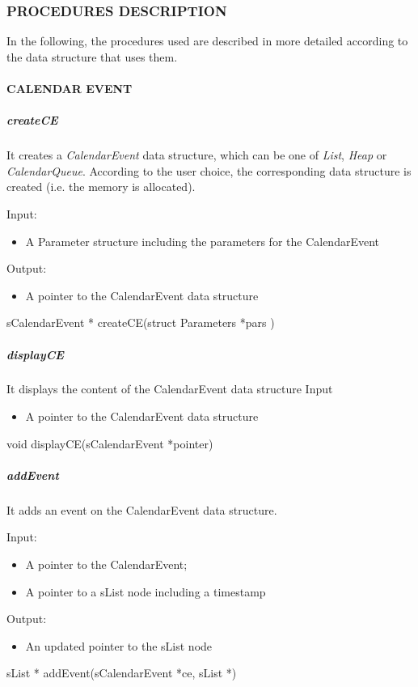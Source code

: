 \subsubsection{PROCEDURES DESCRIPTION}
In the following, the procedures used are described in more detailed according to the data structure that uses them.
	
\paragraph{CALENDAR EVENT}


\subparagraph{createCE}

It creates a \textit{CalendarEvent} data structure, which can be one of \textit{List}, \textit{Heap} or \textit{CalendarQueue}. According to the user choice, the corresponding data structure is created (i.e. the memory is allocated).

Input: 
\begin{itemize}
\item A Parameter structure including the parameters for the CalendarEvent
\end{itemize}

Output:
\begin{itemize}
\item A pointer to the CalendarEvent data structure
\end{itemize}
sCalendarEvent * createCE(struct Parameters *pars )

\subparagraph{displayCE}
	 
It displays the content of the CalendarEvent data structure
Input
\begin{itemize}
\item A pointer to the CalendarEvent data structure
\end{itemize}
void displayCE(sCalendarEvent *pointer)

\subparagraph{addEvent}

It adds an event on the CalendarEvent data structure.

Input:
\begin{itemize}
 \item A pointer to the CalendarEvent;
 \item A pointer to a sList node including a timestamp
\end{itemize}
Output:
\begin{itemize}
\item An updated pointer to the sList node 
\end{itemize}
sList * addEvent(sCalendarEvent *ce, sList *)

